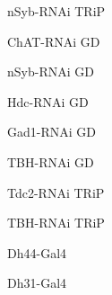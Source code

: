 \documentclass[17pt]{extarticle}
\begin{document}
\footnotesize
\newpage\vspace*{-0.15cm}
\begin{normalsize}
nSyb-RNAi TRiP \\[0.5em]
\end{normalsize}
\footnotesize
\newpage\vspace*{-0.15cm}
\begin{normalsize}
ChAT-RNAi GD \\[0.5em]
\end{normalsize}
\footnotesize
\newpage\vspace*{-0.15cm}
\begin{normalsize}
nSyb-RNAi GD \\[0.5em]
\end{normalsize}
\footnotesize
\newpage\vspace*{-0.15cm}
\begin{normalsize}
Hdc-RNAi GD \\[0.5em]
\end{normalsize}
\footnotesize
\newpage\vspace*{-0.15cm}
\begin{normalsize}
Gad1-RNAi GD \\[0.5em]
\end{normalsize}
\footnotesize
\newpage\vspace*{-0.15cm}
\begin{normalsize}
TBH-RNAi GD \\[0.5em]
\end{normalsize}
\footnotesize
\newpage\vspace*{-0.15cm}
\begin{normalsize}
Tdc2-RNAi TRiP \\[0.5em]
\end{normalsize}
\footnotesize
\newpage\vspace*{-0.15cm}
\begin{normalsize}
TBH-RNAi TRiP \\[0.5em]
\end{normalsize}
\footnotesize
\newpage\vspace*{-0.15cm}
\begin{large}
Dh44-Gal4 \\[0.5em]
\end{large}
\footnotesize
\newpage\vspace*{-0.15cm}
\begin{large}
Dh31-Gal4 \\[0.5em]
\end{large}
\footnotesize
\newpage\vspace*{-0.15cm}
\end{document}
